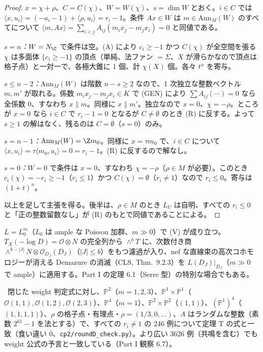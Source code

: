 \begin{proof}
$x=\chi+\rho$、$C=C(\chi)$、$W=W(\chi)$、$s=\dim W$ とおく。$i\in C$ では $\langle x,u_i\rangle=(-a_i-1)+\langle\rho,u_i\rangle=r_i-1$。条件 $Ax\in W$ は $m\in\mathrm{Ann}_M(W)$ のすべてについて $\langle m,Ax\rangle=\sum_{i<j}A_{ij}(m_ix_j-m_jx_i)=0$ と同値である。

\emph{$s=n$：}$W=N_\C$ で条件は空。(A) により $c_i\ge-1$ かつ $C(\chi)$ が全空間を張る $\chi$ は多面体 $\{c_i\ge-1\}$ の頂点（単純、法ファン $=\Sigma$、$X$ が滑らかなので頂点は格子点）と一対一で、各極大錐に 1 個、計 $\chi(X)$ 個。各々 $t^n$ を寄与。

\emph{$s\le n-2$：}$\mathrm{Ann}_M(W)$ は階数 $n-s\ge2$ なので、1 次独立な整数ベクトル $m,m'$ が取れる。係数 $m_ix_j-m_jx_i\in K$ で (GEN) により $\sum A_{ij}(\cdots)=0$ なら全係数 0、すなわち $x\parallel m$。同様に $x\parallel m'$。独立なので $x=0$、$\chi=-\rho$。ところが $x=0$ なら $i\in C$ で $r_i-1=0$ となるが $C\ne\emptyset$ のとき (R) に反する。よって $s\ge1$ の解はなく、残るのは $C=\emptyset$（$s=0$）のみ。

\emph{$s=n-1$：}$\mathrm{Ann}_M(W)=\Z m_0$。同様に $x=\tau m_0$ で、$i\in C$ について $\langle x,u_i\rangle=\tau\langle m_0,u_i\rangle=0=r_i-1$。(R) に反するので解なし。

\emph{$s=0$：}$W=0$ で条件は $x=0$、すなわち $\chi=-\rho$（$\rho\in M$ が必要）。このとき $c_i(\chi)=-r_i\ge-1$（$r_i\le1$）かつ $C(\chi)=\emptyset$（$r_i\ne1$）なので $r_i\le0$。寄与は $(1+t)^n$。

以上を足して主張を得る。後半は、$\rho\in M$ のとき $L_U$ は自明、すべての $r_i\le0$ と「正の整数留数なし」が (R) のもとで同値であることによる。\qedhere
\end{proof}
\begin{rem}[(V) について\ \tC]
$L=L_0^m$（$L_0$ は ample な Poisson 加群、$m\gg0$）で (V) が成り立つ。$T_X(-\log D)=\mathcal O\otimes N$ の完全列から $\wedge^bT$ に、次数付き商 $\wedge^{b-|J|}N\otimes\mathcal O_{D_J}(D_J)$（$|J|\le b$）をもつ濾過が入り、nef な直線束の高次コホモロジーが消える Demazure の消滅（CLS, Thm.\ 9.2.3\tQ）を $L(D_J)|_{D_J}$（$m\gg0$ で ample）に適用する。Part I の定理 6.1（Serre 型）の特別な場合でもある。
\end{rem}
\tV\ 閉じた weight 判定式に対し、$\mathbb{P}^2$（$m=1,2,3$）、$\mathbb{P}^1\times\mathbb{P}^1$（$\mathcal O(1,1),\mathcal O(1,2),\mathcal O(2,3)$）、$\mathbb{P}^4$（$m=1$）、$\mathbb{P}^2\times\mathbb{P}^2$（$(1,1)$）、$(\mathbb{P}^1)^4$（$(1,1,1,1)$）、$\rho$ の格子点・有理点・$\rho=(1/3,0,\dots)$、$A$ はランダムな整数（素数 $2^{61}-1$ を法とする）で、すべての $r_i\ne1$ の 246 例について定理 T の式と一致（食い違い 0、\texttt{cp2/roundD\_check.py}）。より広い 3626 例（共鳴を含む）でも weight 公式の予言と一致している（Part I 観察 6.7）。

